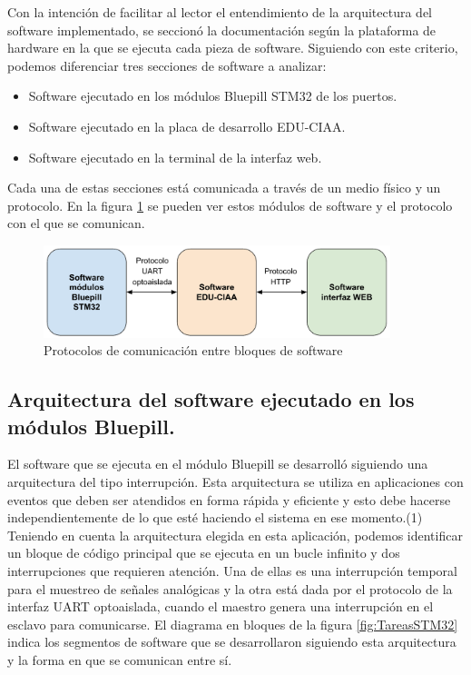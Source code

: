 Con la intención de facilitar al lector el entendimiento de la arquitectura del software implementado, se seccionó la documentación según la plataforma de hardware en la que se ejecuta cada pieza de software. Siguiendo con este criterio, podemos diferenciar tres secciones de software a analizar:
\begin{itemize}
	\item Software ejecutado en los módulos Bluepill STM32 de los puertos.
	\item Software ejecutado en la placa de desarrollo EDU-CIAA.
	\item Software ejecutado en la terminal de la interfaz web.
\end{itemize}
	
Cada una de estas secciones está comunicada a través de un medio físico y un protocolo. En la figura \ref{fig:ProtocolosComSoftware} se pueden ver estos módulos de software y el protocolo con el que se comunican.

\begin{figure}[H]
	\centering
	\includegraphics[width=0.9\textwidth]{./Figures/ProtocolosComSoftware.pdf}
	\caption{Protocolos de comunicación entre bloques de software}
	\label{fig:ProtocolosComSoftware}
\end{figure}

\subsection{Arquitectura del software ejecutado en los módulos Bluepill.}

El software que se ejecuta en el módulo Bluepill se desarrolló siguiendo una arquitectura del tipo interrupción. Esta arquitectura se utiliza en aplicaciones con eventos que deben ser atendidos en forma rápida y eficiente y esto debe hacerse independientemente de lo que esté haciendo el sistema en ese momento.(1)
Teniendo en cuenta la arquitectura elegida en esta aplicación, podemos identificar un bloque de código principal que se ejecuta en un bucle infinito y dos interrupciones que requieren atención. Una de ellas es una interrupción temporal para el muestreo de señales analógicas y la otra está dada por el protocolo de la interfaz UART optoaislada, cuando el maestro genera una interrupción en el esclavo para comunicarse.
El diagrama en bloques de la figura \ref{fig:TareasSTM32} indica los segmentos de software que se desarrollaron siguiendo esta arquitectura y la forma en que se comunican entre sí.

